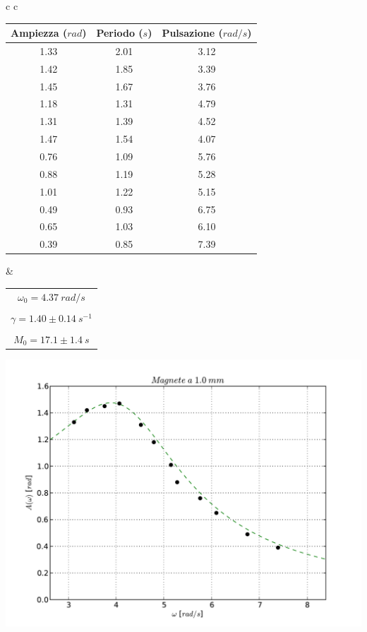 \begin{center}

\begin{tabular}{c c}

\begin{tabular}{c | c | c}

\textbf{Ampiezza} ($rad$) & \textbf{Periodo} ($s$) & \textbf{Pulsazione} ($rad/s$)\\
\midrule
1.33 & 2.01 & 3.12\\
1.42 & 1.85 & 3.39\\
1.45 & 1.67 & 3.76\\
1.18 & 1.31 & 4.79\\
1.31 & 1.39 & 4.52\\
1.47 & 1.54 & 4.07\\
0.76 & 1.09 & 5.76\\
0.88 & 1.19 & 5.28\\
1.01 & 1.22 & 5.15\\
0.49 & 0.93 & 6.75\\
0.65 & 1.03 & 6.10\\
0.39 & 0.85 & 7.39\\

\end{tabular}

& \hspace{1cm}

\begin{tabular}{c}
$\omega_0 = 4.37\ rad/s $\\
\\
$\gamma = 1.40 \pm 0.14\ s^{-1}$\\
\\
$M_0 = 17.1 \pm 1.4\ s$\\
\end{tabular}

\end{tabular}

\end{center}

\begin{center}
\includegraphics[scale=0.75]{"../grafici/Magnetea10mm"}
\end{center}

